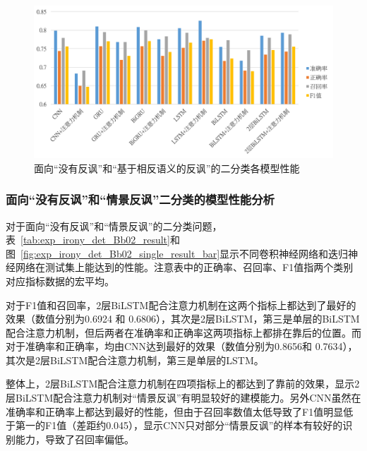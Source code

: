 \begin{figure}[H]
  \centering
  \includegraphics[width=\textwidth]{img/exp_irony_det_Bb01_single_result_bar.png}
  \caption{面向“没有反讽”和“基于相反语义的反讽”的二分类各模型性能}
  \label{fig:exp_irony_det_Bb01_single_result_bar}
\end{figure}

\subsubsection{面向“没有反讽”和“情景反讽”二分类的模型性能分析}
\label{sssec:exp_irony_det_Bb02_base}

对于面向“没有反讽”和“情景反讽”的二分类问题，表~\ref{tab:exp_irony_det_Bb02_result}和图~\ref{fig:exp_irony_det_Bb02_single_result_bar}显示不同卷积神经网络和迭归神经网络在测试集上能达到的性能。注意表中的正确率、召回率、F1值指两个类别对应指标数据的宏平均。

对于F1值和召回率，2层BiLSTM配合注意力机制在这两个指标上都达到了最好的效果（数值分别为0.6924 和 0.6806），其次是2层BiLSTM，第三是单层的BiLSTM配合注意力机制，但后两者在准确率和正确率这两项指标上都排在靠后的位置。而对于准确率和正确率，均由CNN达到最好的效果（数值分别为0.8656和 0.7634），其次是2层BiLSTM配合注意力机制，第三是单层的LSTM。

整体上，2层BiLSTM配合注意力机制在四项指标上的都达到了靠前的效果，显示2层BiLSTM配合注意力机制对“情景反讽”有明显较好的建模能力。另外CNN虽然在准确率和正确率上都达到最好的性能，但由于召回率数值太低导致了F1值明显低于第一的F1值（差距约0.045），显示CNN只对部分“情景反讽”的样本有较好的识别能力，导致了召回率偏低。


